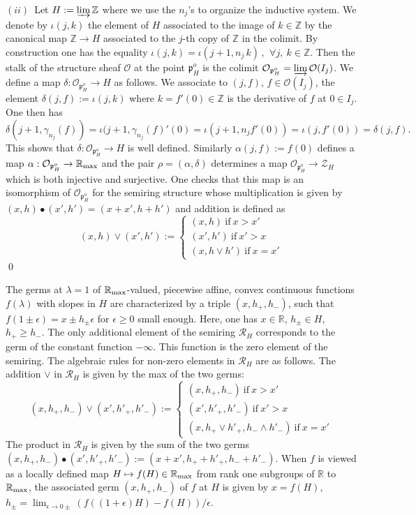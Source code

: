 \documentclass{elsart3-1}
\def\R{{\mathbb R}}
\def\Z{{\mathbb Z}}
\def\cO{{\mathcal O}}
\def\cR{{\mathcal R}}
\def\cZ{{\mathcal Z}}
\def\qqq{\,,\,~\forall}
\def\ffp{\mathfrak{p}}
\def\rma{\R_{\rm max}}
\def\vsp{\vspace{.05in}}
\begin{document}
$(ii)$~Let $H:=\varinjlim \Z$ where we use the $n_j$'s to organize the inductive system. We denote by $\iota(j,k)$ the element of $H$ associated to the image of $k\in \Z$ by the canonical map $\Z\to H$ associated to the $j$-th copy of $\Z$ in the colimit. By construction one has the equality
$
\iota(j,k)=\iota(j+1, n_j\, k)\qqq j, \ k\in \Z
$.
Then the stalk of the structure sheaf $\cO$ at the point $\ffp_H^o$ is the colimit $\cO_{\ffp_H^o}=\varinjlim \cO(I_j)$. We define a map $\delta:\cO_{\ffp_H^o}\to H$ as follows. We associate to $(j,f)$, $f\in \cO(I_j)$, the element 
$\delta(j,f):=\iota(j,k)$ where $k=f'(0)\in \Z$ is the derivative of $f$ at $0\in I_j$. One then has 
$$
\delta(j+1,\gamma_{n_j}(f))=\iota(j+1,\gamma_{n_j}(f)'(0)=\iota(j+1,n_jf'(0))=\iota(j,f'(0))=\delta(j,f).
$$
This shows that $\delta:\cO_{\ffp_H^o}\to H$ is well defined. Similarly $\alpha(j,f):=f(0)$ defines a map $\alpha:\cO_{\ffp_H^o}\to \rma$ and the pair $\rho=(\alpha,\delta)$ determines a map $\cO_{\ffp_H^o}\to \cZ_H$ which is both injective and surjective. One checks that this map is an isomorphism of $\cO_{\ffp_H^o}$ for the semiring structure whose multiplication is given by $(x,h)\bullet (x',h')=(x+x',h+h')$ and addition is defined as
$$
(x,h)\vee (x',h'):=\begin{cases} (x,h)\ \text{if}\ x>x'\\(x',h')\ \text{if}\ x'>x\\
(x,h \vee h') \ \text{if}\ x=x'\end{cases}
$$  
\qed

 The germs at $\lambda=1$ of $\rma$-valued, piecewise affine, convex continuous functions $f(\lambda)$ with slopes in $H$ are characterized by a triple $(x,h_+,h_-)$,  such that $f(1\pm \epsilon)=x
\pm h_\pm \epsilon$ for $\epsilon \geq 0$ small enough. Here, one has $x\in \R$, $h_\pm\in H$, $h_+\geq h_-$. The only additional  element of the semiring $\cR_H$ corresponds to the germ of the constant function $-\infty$. This function is the zero element of the semiring. The algebraic rules  for non-zero elements in $\cR_H$ are as follows. The addition $\vee$ in $\cR_H$ is given by the max of the two germs:
$$
(x,h_+,h_-)\vee (x',h'_+,h'_-):=\begin{cases} (x,h_+,h_-)\ \text{if}\ x>x'\\(x',h'_+,h'_-)\ \text{if}\ x'>x\\
(x,h_+\vee h'_+, h_-\wedge h'_-) \ \text{if}\ x=x'\end{cases}
$$
The product in $\cR_H$ is given by the sum of the two germs 
$
(x,h_+,h_-)\bullet (x',h'_+,h'_-):=(x+x',h_++h'_+,h_-+h'_-).
$
When $f$ is viewed as a locally defined map $H\mapsto f(H)\in\rma$ from rank one subgroups of $\R$ to $\rma$, the associated germ $(x,h_+,h_-)$ of $f$ at $H$ is given by $x=f(H)$, $h_
\pm=\lim_{\epsilon\to 0\pm}(f((1+\epsilon) H)-f(H))/\epsilon$. 
\vsp
\end{document}
